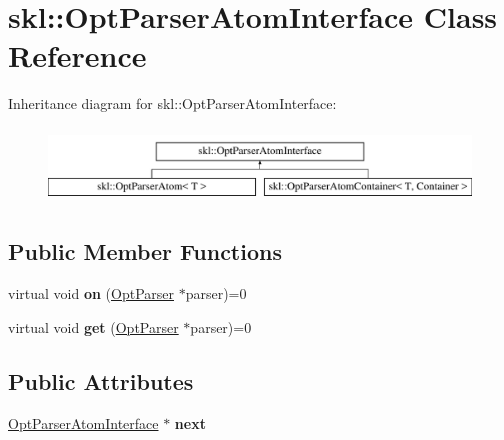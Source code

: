 \hypertarget{classskl_1_1_opt_parser_atom_interface}{}\section{skl\+:\+:Opt\+Parser\+Atom\+Interface Class Reference}
\label{classskl_1_1_opt_parser_atom_interface}
Inheritance diagram for skl\+:\+:Opt\+Parser\+Atom\+Interface\+:\begin{figure}[H]
\begin{center}
\leavevmode
\includegraphics[height=2.000000cm]{classskl_1_1_opt_parser_atom_interface}
\end{center}
\end{figure}
\subsection*{Public Member Functions}
\begin{DoxyCompactItemize}
\item 
\hypertarget{classskl_1_1_opt_parser_atom_interface_a4326bc85c2f177e52f530a0b10ec1fec}{}\label{classskl_1_1_opt_parser_atom_interface_a4326bc85c2f177e52f530a0b10ec1fec} 
virtual void {\bfseries on} (\hyperlink{classskl_1_1_opt_parser}{Opt\+Parser} $\ast$parser)=0
\item 
\hypertarget{classskl_1_1_opt_parser_atom_interface_af54d653154f8f8183ca356e04328cea8}{}\label{classskl_1_1_opt_parser_atom_interface_af54d653154f8f8183ca356e04328cea8} 
virtual void {\bfseries get} (\hyperlink{classskl_1_1_opt_parser}{Opt\+Parser} $\ast$parser)=0
\end{DoxyCompactItemize}
\subsection*{Public Attributes}
\begin{DoxyCompactItemize}
\item 
\hypertarget{classskl_1_1_opt_parser_atom_interface_a6bc8353a1cd5a05bb2330474a721d14f}{}\label{classskl_1_1_opt_parser_atom_interface_a6bc8353a1cd5a05bb2330474a721d14f} 
\hyperlink{classskl_1_1_opt_parser_atom_interface}{Opt\+Parser\+Atom\+Interface} $\ast$ {\bfseries next}
\end{DoxyCompactItemize}
